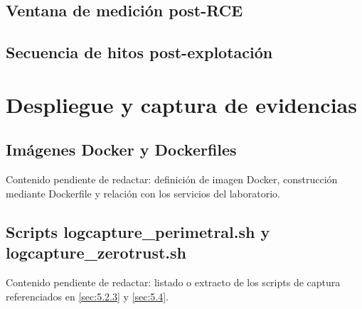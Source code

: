 \documentclass[11pt,spanish,listoffigures,listoftables]{tfgetsinf}
\begin{document}
\section{Ventana de medición post-RCE}

\section{Secuencia de hitos post-explotación}


\chapter{Despliegue y captura de evidencias}
\label{anexo:scripts_captura}

\section{Imágenes Docker y Dockerfiles}
\label{anexo:docker}

Contenido pendiente de redactar: definición de imagen Docker, construcción mediante Dockerfile y relación con los servicios del laboratorio.

\section{Scripts logcapture\_perimetral.sh y logcapture\_zerotrust.sh}

Contenido pendiente de redactar: listado o extracto de los scripts de captura referenciados en \cref{sec:5.2.3} y \cref{sec:5.4}. 



\end{document}
